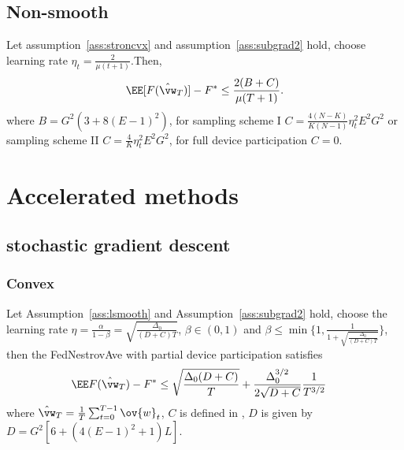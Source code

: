 \subsection{Non-smooth}
\begin{theorem}
	Let assumption~\ref{ass:stroncvx} and assumption~\ref{ass:subgrad2} hold, choose learning rate $\eta_t = \frac{2}{\mu(t+1)} $.Then,
	\begin{align}
		\EE[F(\hat{\vw}_T)] - F^* \leq \frac{2(B + C)}{\mu(T+1)}.
	\end{align}
	where $B =  G^2 (3  + 8 (E-1)^2)$, for sampling scheme I $C =\frac{4(N - K)}{K(N-1)} \eta_t^2 E^2G^2 $ or
sampling scheme II $C = \frac{4}{K} \eta_t^2 E^2G^2$, for full device participation $C= 0$.
\end{theorem}


\section{Accelerated methods}
\subsection{stochastic gradient descent}
\subsubsection{Convex}
\begin{theorem}
	Let Assumption~\ref{ass:lsmooth} and Assumption~\ref{ass:subgrad2} hold,  choose the learning rate $\eta = \frac{\alpha}{1 - \beta} = \sqrt{\frac{\Delta_0}{(D+C)T}}$, $\beta \in (0, 1)$ and $\beta \leq \min\{1, \frac{1}{1 + \sqrt{\frac{\Delta_0}{(D+C)T}}}\}$, then the FedNestrovAve with partial device participation satisfies
	\begin{align}
		 \EE F(\hat{\vw}_T) - F^* &\leq \sqrt{\frac{\Delta_0(D + C)}{T}} + \frac{\Delta_0^{3/2}}{2\sqrt{D+C}}\frac{1}{T^{3/2}} 
	\end{align}
	where $\hat{\vw}_T = \frac{1}{T}\sum_{t=0}^{T-1} \ov{w}_t$, $C$ is defined in \eq{\ref{eq:partialsample}},
$D$ is given by $D =  G^2[6 + (4(E-1)^2+1)L]$.
\end{theorem}

